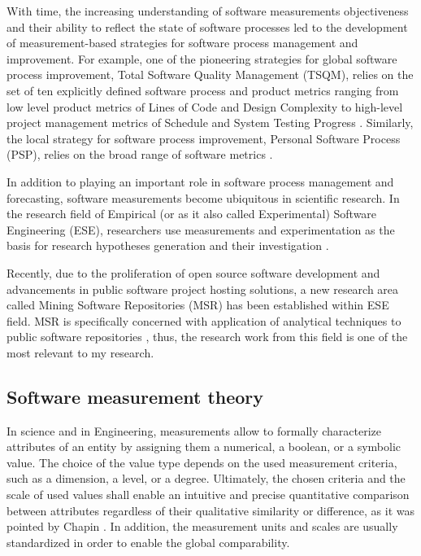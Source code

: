 With time, the increasing understanding of software measurements objectiveness and their ability to reflect 
the state of software processes led to the development of measurement-based strategies for software 
process management and improvement. 
For example, one of the pioneering strategies for global software process improvement, 
Total Software Quality Management (TSQM), relies on the set of ten explicitly defined software 
process and product metrics ranging from low level product metrics of Lines of Code and Design Complexity to 
high-level project management metrics of Schedule and System Testing Progress \cite{citeulike:13071448}.
Similarly, the local strategy for software process improvement, Personal Software Process (PSP), relies on 
the broad range of software metrics \cite{citeulike:13072239}.

In addition to playing an important role in software process management and forecasting, software 
measurements become ubiquitous in scientific research. 
In the research field of Empirical (or as it also called Experimental) Software Engineering (ESE), 
researchers use measurements and experimentation as the basis for research hypotheses 
generation and their investigation \cite{citeulike:766768}. 

Recently, due to the proliferation of open source software development and advancements in public software
project hosting solutions, a new research area called Mining Software Repositories (MSR) has been established 
within ESE field. MSR is specifically concerned with application of analytical techniques to public software 
repositories \cite{citeulike:12550438} \cite{citeulike:4534888} \cite{citeulike:2710928}, thus, 
the research work from this field is one of the most relevant to my research.

\subsection{Software measurement theory}
In science and in Engineering, measurements allow to formally characterize attributes of an entity by assigning 
them a numerical, a boolean, or a symbolic value. 
The choice of the value type depends on the used measurement criteria, such as a dimension, a level, 
or a degree. Ultimately, the chosen criteria and the scale of used values shall enable an intuitive 
and precise quantitative comparison between attributes regardless of their qualitative similarity or 
difference, as it was pointed by Chapin \cite{citeulike:13158806}. 
In addition, the measurement units and scales are usually standardized in order to enable the global comparability.

